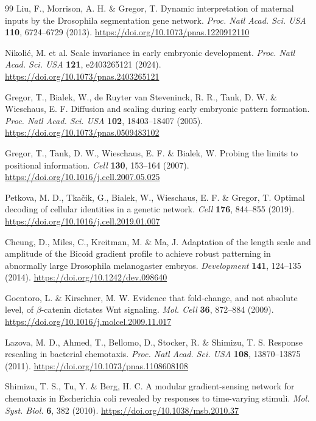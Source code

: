 \documentclass[11pt,a4paper]{article}
\begin{document}
\begin{thebibliography}{99}
Liu, F., Morrison, A. H. \& Gregor, T. Dynamic interpretation of maternal inputs by the Drosophila segmentation gene network. \emph{Proc. Natl Acad. Sci. USA} \textbf{110}, 6724--6729 (2013). \url{https://doi.org/10.1073/pnas.1220912110}

Nikoli\'c, M. et al. Scale invariance in early embryonic development. \emph{Proc. Natl Acad. Sci. USA} \textbf{121}, e2403265121 (2024). \url{https://doi.org/10.1073/pnas.2403265121}

Gregor, T., Bialek, W., de Ruyter van Steveninck, R. R., Tank, D. W. \& Wieschaus, E. F. Diffusion and scaling during early embryonic pattern formation. \emph{Proc. Natl Acad. Sci. USA} \textbf{102}, 18403--18407 (2005). \url{https://doi.org/10.1073/pnas.0509483102}

Gregor, T., Tank, D. W., Wieschaus, E. F. \& Bialek, W. Probing the limits to positional information. \emph{Cell} \textbf{130}, 153--164 (2007). \url{https://doi.org/10.1016/j.cell.2007.05.025}

Petkova, M. D., Tka\v{c}ik, G., Bialek, W., Wieschaus, E. F. \& Gregor, T. Optimal decoding of cellular identities in a genetic network. \emph{Cell} \textbf{176}, 844--855 (2019). \url{https://doi.org/10.1016/j.cell.2019.01.007}

Cheung, D., Miles, C., Kreitman, M. \& Ma, J. Adaptation of the length scale and amplitude of the Bicoid gradient profile to achieve robust patterning in abnormally large Drosophila melanogaster embryos. \emph{Development} \textbf{141}, 124--135 (2014). \url{https://doi.org/10.1242/dev.098640}

Goentoro, L. \& Kirschner, M. W. Evidence that fold-change, and not absolute level, of $\beta$-catenin dictates Wnt signaling. \emph{Mol. Cell} \textbf{36}, 872--884 (2009). \url{https://doi.org/10.1016/j.molcel.2009.11.017}

Lazova, M. D., Ahmed, T., Bellomo, D., Stocker, R. \& Shimizu, T. S. Response rescaling in bacterial chemotaxis. \emph{Proc. Natl Acad. Sci. USA} \textbf{108}, 13870--13875 (2011). \url{https://doi.org/10.1073/pnas.1108608108}

Shimizu, T. S., Tu, Y. \& Berg, H. C. A modular gradient-sensing network for chemotaxis in Escherichia coli revealed by responses to time-varying stimuli. \emph{Mol. Syst. Biol.} \textbf{6}, 382 (2010). \url{https://doi.org/10.1038/msb.2010.37}


\end{thebibliography}
\end{document}
